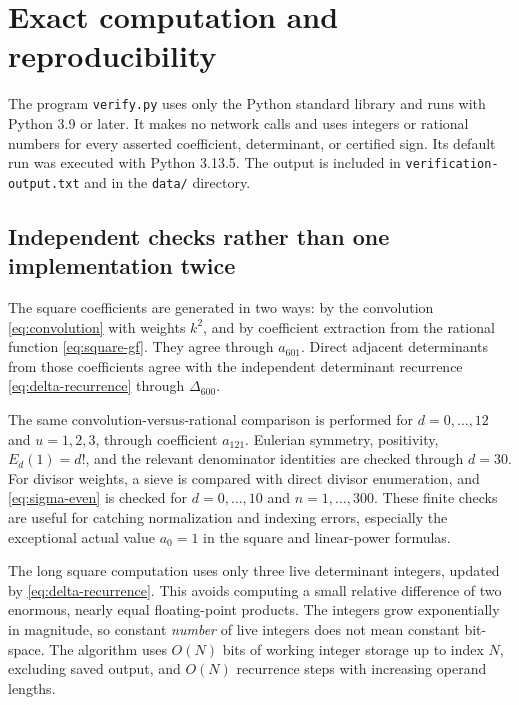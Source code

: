 \documentclass[11pt,letterpaper]{article}
\theoremstyle{definition}
\newcommand{\Delt}{\Delta}
\numberwithin{equation}{section}
\begin{document}
\section{Exact computation and reproducibility}
\label{sec:computation}

The program \texttt{verify.py} uses only the Python standard library
and runs with Python 3.9 or later. It makes no network calls and uses
integers or rational numbers for every asserted coefficient, determinant,
or certified sign. Its default run was executed with Python 3.13.5.
The output is included in \texttt{verification-output.txt} and in the
\texttt{data/} directory.

\subsection{Independent checks rather than one implementation twice}

The square coefficients are generated in two ways: by the convolution
\eqref{eq:convolution} with weights $k^2$, and by coefficient extraction
from the rational function \eqref{eq:square-gf}. They agree through
$a_{601}$. Direct adjacent determinants from those coefficients agree
with the independent determinant recurrence \eqref{eq:delta-recurrence}
through $\Delt_{600}$.

The same convolution-versus-rational comparison is performed for
$d=0,\ldots,12$ and $u=1,2,3$, through coefficient $a_{121}$.
Eulerian symmetry, positivity, $E_d(1)=d!$, and the relevant denominator
identities are checked through $d=30$.
For divisor weights, a sieve is compared with direct divisor enumeration,
and \eqref{eq:sigma-even} is checked for $d=0,\ldots,10$ and
$n=1,\ldots,300$.
These finite checks are useful for catching normalization and indexing
errors, especially the exceptional actual value $a_0=1$ in the square
and linear-power formulas.

The long square computation uses only three live determinant integers,
updated by \eqref{eq:delta-recurrence}. This avoids computing a small
relative difference of two enormous, nearly equal floating-point products.
The integers grow exponentially in magnitude, so constant \emph{number}
of live integers does not mean constant bit-space. The algorithm uses
$O(N)$ bits of working integer storage up to index $N$, excluding saved
output, and $O(N)$ recurrence steps with increasing operand lengths.
\end{document}
